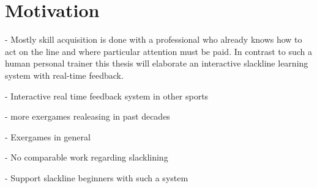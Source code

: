 \section{Motivation}

- Mostly skill acquisition is done with a professional who already knows how to act on the line and where particular attention must be paid. In contrast to such a human personal trainer this thesis will elaborate an interactive slackline learning system with real-time feedback. 

- Interactive real time feedback system in other sports

- more exergames realeasing in past decades

- Exergames in general

- No comparable work regarding slacklining

- Support slackline beginners with such a system